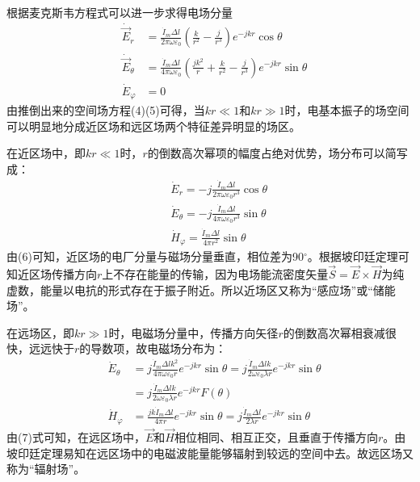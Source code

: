 \documentclass{article}
\begin{document}
根据麦克斯韦方程式可以进一步求得电场分量
\begin{eqnarray}
  & \dot{\vec{E}}_r & = \frac{\dot{I}_m \Delta l}{2 \pi \omega \varepsilon_0}
  \left( \frac{k}{r^2} - \frac{j}{r^3} \right) e^{- j k r} \cos \theta
  \nonumber\\
  & \dot{\vec{E}}_{\theta} & = \frac{\dot{I}_m \Delta l}{4 \pi \omega
  \varepsilon_0} \left( \frac{j k^2}{r} + \frac{k}{r^2} - \frac{j}{r^3}
  \right) e^{- j k r} \sin \theta \\
  & \dot{E}_{\varphi} & = 0 \nonumber
\end{eqnarray}
由推倒出来的空间场方程(4)(5)可得，当$k r \ll 1$和$k r \gg
1$时，电基本振子的场空间可以明显地分成近区场和远区场两个特征差异明显的场区。

在近区场中，即$k r \ll
1$时，$r$的倒数高次幂项的幅度占绝对优势，场分布可以简写成：
\begin{eqnarray}
  &  & \dot{E}_r = - j \frac{\dot{I}_m \Delta l}{2 \pi \omega \varepsilon_0
  r^3} \cos \theta \nonumber\\
  &  & \dot{E}_{\theta} = - j \frac{\dot{I}_m \Delta l}{4 \pi \omega
  \varepsilon_0 r^3} \sin \theta \\
  &  & \dot{H}_{\varphi} = \frac{\dot{I}_m \Delta l}{4 \pi r^2} \sin \theta
  \nonumber
\end{eqnarray}
由(6)可知，近区场的电厂分量与磁场分量垂直，相位差为90$^{\circ}$。根据坡印廷定理可知近区场传播方向$r$上不存在能量的传输，因为电场能流密度矢量$\vec{S}
= \vec{E} \times
\vec{H}$为纯虚数，能量以电抗的形式存在于振子附近。所以近场区又称为“感应场”或“储能场”。

在远场区，即$k r \gg
1$时，电磁场分量中，传播方向矢径$r$的倒数高次幂相衰减很快，远远快于$r$的导数项，故电磁场分布为：
\begin{eqnarray}
  & \dot{E}_{\theta} & = j \frac{\dot{I}_m \Delta l k^2}{4 \pi \omega
  \varepsilon_0 r} e^{- j k r} \sin \theta = j \frac{\dot{I}_m \Delta l k}{2
  \omega \varepsilon_0 \lambda r} e^{- j k r} \sin \theta \nonumber\\
  &  & = j \frac{\dot{I}_m \Delta l k}{2 \omega \varepsilon_0 \lambda r} e^{-
  j k r} F \left( \theta \right) \\
  & \dot{H}_{\varphi} & = \frac{j k \dot{I}_m \Delta l}{4 \pi r} e^{- j k r}
  \sin \theta = j \frac{\dot{I}_m \Delta l}{2 \lambda r} e^{- j k r} \sin
  \theta \nonumber
\end{eqnarray}
由(7)式可知，在远区场中，$\vec{E}$和$\vec{H}$相位相同、相互正交，且垂直于传播方向$r$。由坡印廷定理易知在远区场中的电磁波能量能够辐射到较远的空间中去。故远区场又称为“辐射场”。
\end{document}
